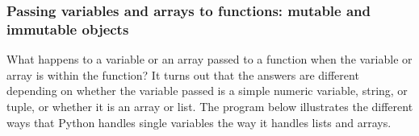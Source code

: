 \documentclass[letterpaper,10pt,english]{sphinxmanual}
\begin{document}
\subsubsection{Passing variables and arrays to functions: mutable and immutable objects}
\label{\detokenize{chap7/chap7_funcs:passing-variables-and-arrays-to-functions-mutable-and-immutable-objects}}
\sphinxAtStartPar
What happens to a variable or an array passed to a function when the variable or array is  within the function?  It turns out that the answers are different depending on whether the variable passed is a simple numeric variable, string, or tuple, or whether it is an array or list.  The program below illustrates the different ways that Python handles single variables  the way it handles lists and arrays.
\end{document}
